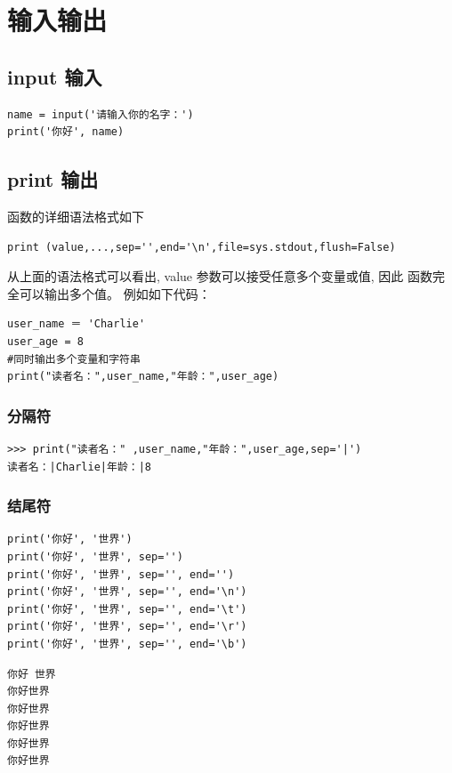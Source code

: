 \chapter{输入输出}
\section{input 输入}
\begin{lstlisting}[style=pythonstyle,numbers=none]
name = input('请输入你的名字：')
print('你好', name)
\end{lstlisting}


\section{print 输出}
 函数的详细语法格式如下
\begin{lstlisting}[style=demostyle,numbers=none]
print (value,...,sep='',end='\n',file=sys.stdout,flush=False)
\end{lstlisting}
从上面的语法格式可以看出, value 参数可以接受任意多个变量或值, 因此  函数完全可以输出多个值。
例如如下代码：
\begin{lstlisting}[style=pythonstyle,numbers=none]
user_name ＝ 'Charlie'
user_age = 8
#同时输出多个变量和字符串
print("读者名：",user_name,"年龄：",user_age)
\end{lstlisting}

\subsection{分隔符}
\begin{lstlisting}[style=demostyle,numbers=none]
>>> print("读者名：" ,user_name,"年龄：",user_age,sep='|')
读者名：|Charlie|年龄：|8
\end{lstlisting}

\subsection{结尾符}
\begin{lstlisting}[style=pythonstyle,numbers=none]
print('你好', '世界')
print('你好', '世界', sep='')
print('你好', '世界', sep='', end='')
print('你好', '世界', sep='', end='\n')
print('你好', '世界', sep='', end='\t')
print('你好', '世界', sep='', end='\r')
print('你好', '世界', sep='', end='\b')
\end{lstlisting}
\begin{lstlisting}[style=demostyle,numbers=none]
你好 世界
你好世界
你好世界
你好世界
你好世界
你好世界
\end{lstlisting}

